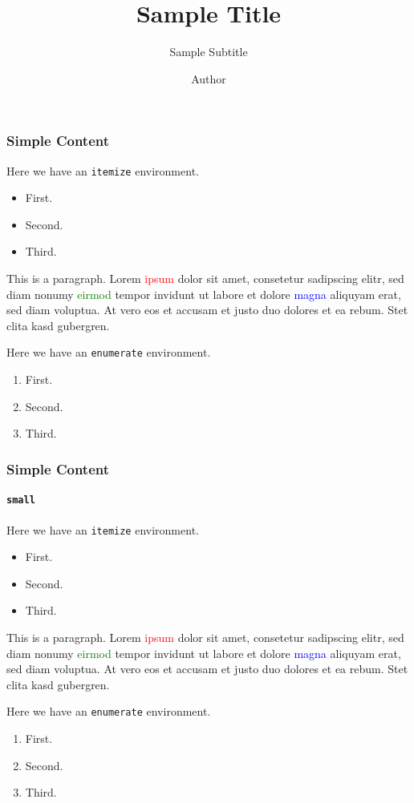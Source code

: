 \title{Sample Title}
\subtitle{Sample Subtitle}
\author{Author}


	\begin{frame}
		\titlepage
	\end{frame}
	
	\begin{frame}
		\frametitle{Simple Content}
		Here we have an \texttt{itemize} environment.
		\begin{itemize}
			\item First.
			\item Second.
			\item Third.
		\end{itemize}
		\vspace{1em}
		
		This is a paragraph. Lorem \textcolor{red}{ipsum} dolor sit amet, consetetur sadipscing elitr, sed diam nonumy \textcolor{green}{eirmod} tempor invidunt ut labore et dolore \textcolor{blue}{magna} aliquyam erat, sed diam voluptua. At vero eos et accusam et justo duo dolores et ea rebum. Stet clita kasd gubergren.
		\vspace{1em}
		
		Here we have an \texttt{enumerate} environment.
		\begin{enumerate}
			\item First.
			\item Second.
			\item Third.
		\end{enumerate}
	\end{frame}
	
	\begin{framefont}{\small}
	\begin{frame}
		\frametitle{Simple Content}
		\framesubtitle{\texttt{small}}
		Here we have an \texttt{itemize} environment.
		\begin{itemize}
			\item First.
			\item Second.
			\item Third.
		\end{itemize}
		\vspace{1em}
		
		This is a paragraph. Lorem \textcolor{red}{ipsum} dolor sit amet, consetetur sadipscing elitr, sed diam nonumy \textcolor{green}{eirmod} tempor invidunt ut labore et dolore \textcolor{blue}{magna} aliquyam erat, sed diam voluptua. At vero eos et accusam et justo duo dolores et ea rebum. Stet clita kasd gubergren.
		\vspace{1em}
		
		Here we have an \texttt{enumerate} environment.
		\begin{enumerate}
			\item First.
			\item Second.
			\item Third.
		\end{enumerate}
	\end{frame}
	\end{framefont}
	

